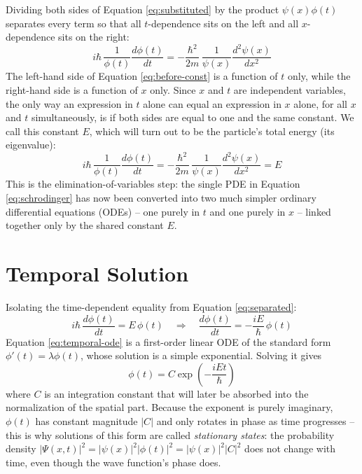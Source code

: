 \documentclass[12pt, a4paper]{article}
\begin{document}
Dividing both sides of Equation \eqref{eq:substituted} by the product
$\psi(x)\phi(t)$ separates every term so that all $t$-dependence sits
on the left and all $x$-dependence sits on the right:
\begin{equation}
    i\hbar\, \frac{1}{\phi(t)}\frac{d\phi(t)}{dt}
    = -\frac{\hbar^2}{2m}\, \frac{1}{\psi(x)}\frac{d^2\psi(x)}{dx^2}
    \label{eq:before-const}
\end{equation}
The left-hand side of Equation \eqref{eq:before-const} is a function of
$t$ only, while the right-hand side is a function of $x$ only. Since
$x$ and $t$ are independent variables, the only way an expression in
$t$ alone can equal an expression in $x$ alone, for all $x$ and $t$
simultaneously, is if both sides are equal to one and the same
constant. We call this constant $E$, which will turn out to be the
particle's total energy (its eigenvalue):
\begin{equation}
    i\hbar\, \frac{1}{\phi(t)}\frac{d\phi(t)}{dt}
    = -\frac{\hbar^2}{2m}\, \frac{1}{\psi(x)}\frac{d^2\psi(x)}{dx^2}
    = E
    \label{eq:separated}
\end{equation}
This is the elimination-of-variables step: the single PDE in
Equation \eqref{eq:schrodinger} has now been converted into two much
simpler ordinary differential equations (ODEs) -- one purely in $t$
and one purely in $x$ -- linked together only by the shared constant
$E$.

\section{Temporal Solution}
Isolating the time-dependent equality from Equation
\eqref{eq:separated}:
\begin{equation}
    i\hbar\, \frac{d\phi(t)}{dt} = E\,\phi(t)
    \quad \Longrightarrow \quad
    \frac{d\phi(t)}{dt} = -\frac{iE}{\hbar}\,\phi(t)
    \label{eq:temporal-ode}
\end{equation}
Equation \eqref{eq:temporal-ode} is a first-order linear ODE of the
standard form $\phi'(t) = \lambda \phi(t)$, whose solution is a simple
exponential. Solving it gives
\begin{equation}
    \phi(t) = C \exp\!\left(-\frac{iEt}{\hbar}\right)
    \label{eq:temporal}
\end{equation}
where $C$ is an integration constant that will later be absorbed into
the normalization of the spatial part. Because the exponent is purely
imaginary, $\phi(t)$ has constant magnitude $|C|$ and only rotates in
phase as time progresses -- this is why solutions of this form are
called \emph{stationary states}: the probability density
$|\Psi(x,t)|^2 = |\psi(x)|^2 |\phi(t)|^2 = |\psi(x)|^2 |C|^2$ does not
change with time, even though the wave function's phase does.
\end{document}
